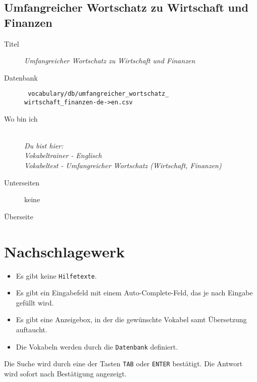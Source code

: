 \subsection{ Umfangreicher Wortschatz zu Wirtschaft und Finanzen }
\label{has:voc-practice-page5}
\begin{description}
	\item[Titel] \emph{ Umfangreicher Wortschatz zu Wirtschaft und Finanzen }
	\item[Datenbank] \texttt{ vocabulary/db/umfangreicher\_wortschatz\_\\wirtschaft\_finanzen-de->en.csv }
	\item[Wo bin ich] \emph{\\Du bist hier:\\Vokabeltrainer - Englisch\\Vokabeltest - Umfangreicher Wortschatz (Wirtschaft, Finanzen)}
	\item[Unterseiten] keine
	\item[Überseite] 
\end{description}

\section{ Nachschlagewerk }
\label{has:voc-dict}

\begin{itemize}
	\item Es gibt keine \texttt{Hilfetexte}.
	\item Es gibt ein Eingabefeld mit einem Auto-Complete-Feld, das je nach Eingabe gefüllt wird.
	\item Es gibt eine Anzeigebox, in der die gewünschte Vokabel samt Übersetzung auftaucht.
	\item Die Vokabeln werden durch die \texttt{Datenbank} definiert.

\end{itemize}

Die Suche wird durch eine der Tasten \texttt{TAB} oder \texttt{ENTER} bestätigt. 
Die Antwort wird sofort nach Bestätigung angezeigt. 

